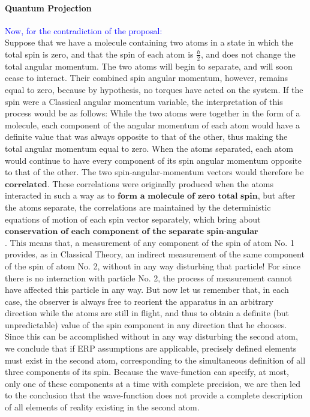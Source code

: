\documentclass[a4paper, 10pt, onepage]{elegantbook}
\begin{document}
{\paragraph{Quantum Projection}
\noindent

\textcolor{blue}{Now, for the contradiction of the proposal:}  \\
Suppose that we have a molecule containing two atoms in a state in which the total spin is zero, and that the spin of each atom is $\frac{\hbar}{2}$, and does not change the total angular momentum. The two atoms will begin to separate, and will soon cease to interact. Their combined spin angular momentum, however, remains equal to zero, because by hypothesis, no torques have acted on the system. If the spin were a Classical angular momentum variable, the interpretation of this process would be as follows: While the two atoms were together in the form of a molecule, each component of the angular momentum of each atom would have a definite value that was always opposite to that of the other, thus making the total angular momentum equal to zero. When the atoms separated, each atom would continue to have every component of its spin angular momentum opposite to that of the other. The two spin-angular-momentum vectors would therefore be $\mathbf{correlated}$. These correlations were originally produced when the atoms interacted in such a way as to $\mathbf{\textbf{form a molecule of zero total spin}}$, but after the atoms separate, the correlations are maintained by the deterministic equations of motion of each spin vector separately, which bring about $\mathbf{\textbf{conservation of each component of the separate spin-angular momentum vectors}}$.
This means that, a measurement of any component of the spin of atom No. 1 provides, as in Classical Theory, an indirect measurement of the same component of the spin of atom No. 2, without in any way disturbing that particle! For since there is no interaction with particle No. 2, the process of measurement cannot have affected this particle in any way.
But now let us remember that, in each case, the observer is always free to reorient the apparatus in an arbitrary direction while the atoms are still in flight, and thus to obtain a definite (but unpredictable) value of the spin component in any direction that he chooses. Since this can be accomplished without in any way disturbing the second atom, we conclude that if ERP assumptions are applicable, precisely defined elements must exist in the second atom, corresponding to the simultaneous definition of all three components of its spin. Because the wave-function can specify, at most, only one of these components at a time with complete precision, we are then led to the conclusion that the wave-function does not provide a complete description of all elements of reality existing in the second atom.
}
\end{document}
